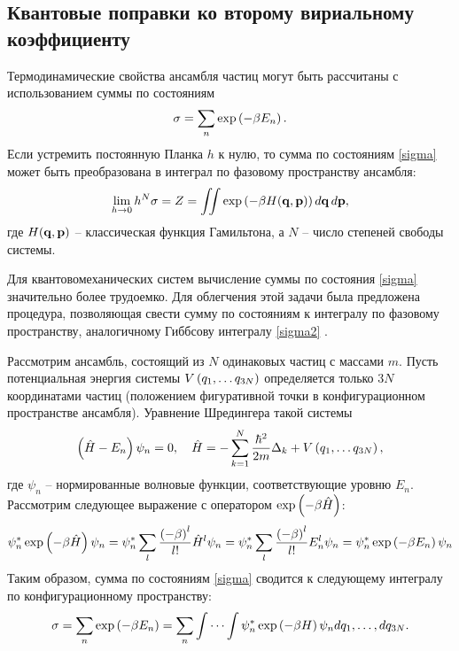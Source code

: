 \subsection{Квантовые поправки ко второму вириальному коэффициенту}

Термодинамические свойства ансамбля частиц могут быть рассчитаны с использованием суммы по состояниям
\vverh
\begin{gather}
	\sigma = \sum_n \exp \left( - \beta E_n \right). \label{sigma}  
\end{gather}
Если устремить постоянную Планка $h$ к нулю, то сумма по состояниям \eqref{sigma} может быть преобразована в интеграл по фазовому пространству ансамбля:
\vverh
\begin{gather}
	\lim_{h \rightarrow 0} h^N \sigma = Z = \iint \exp \left( - \beta H(\mathbf{q}, \mathbf{p}) \right) d \mathbf{q} \, d \mathbf{p}, \label{sigma2}
\end{gather}
где $H(\mathbf{q}, \mathbf{p})$ -- классическая функция Гамильтона, а $N$ -- число степеней свободы системы. \par
Для квантовомеханических систем вычисление суммы по состояния \eqref{sigma} значительно более трудоемко. Для облегчения этой задачи была предложена процедура, позволяющая свести сумму по состояниям к интегралу по фазовому пространству, аналогичному Гиббсову интегралу \eqref{sigma2} \cite{kirkwood1933}. \par 
Рассмотрим ансамбль, состоящий из $N$ одинаковых частиц с массами $m$. Пусть потенциальная энергия системы $V \left( q_1, \dots q_{3N} \right)$  определяется только $3 N$ координатами частиц (положением фигуративной точки в конфигурационном пространстве ансамбля). Уравнение Шредингера такой системы 
\vverh
\begin{gather}
	\left( \hat{H} - E_n \right) \psi_n = 0, \quad \hat{H} = - \sum_{k = 1}^{N} \frac{\hbar^2}{2m} \Delta_k + V \left( q_1, \dots q_{3N} \right), \notag 
\end{gather}
где $\psi_n$ -- нормированные волновые функции, соответствующие уровню $E_n$. Рассмотрим следующее выражение с оператором $\exp \left( - \beta \hat{H }\right)$:
\vverh
\begin{gather}
	\psi_n^{*} \exp \left( - \beta \hat{H} \right) \psi_n = \psi_n^{*} \sum_l \frac{ \left( - \beta \right)^l}{l!} \hat{H}^l \psi_n = \psi_n^{*} \sum_l \frac{ \left( - \beta \right)^l}{l!} E_n^l \psi_n = \psi_n^{*} \exp \left( - \beta E_n \right) \psi_n 
\end{gather}
Таким образом, сумма по состояниям \eqref{sigma} сводится к следующему интегралу по конфигурационному пространству:
\vverh
\begin{gather}
	\sigma = \sum_n \exp \left( - \beta E_n \right) = \sum_n \idotsint \psi_n^{*} \exp \left( - \beta H \right) \psi_n d q_1, \dots, d q_{3N}. \label{sigma3}  
\end{gather}

